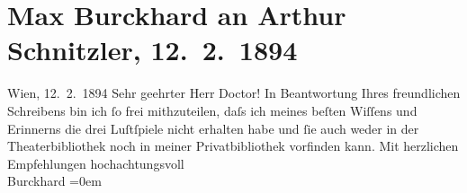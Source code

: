 

         
         \renewcommand{\erwaehntePersonen}{Personen: Max Eugen Burckhard}
         \renewcommand{\erwaehnteInstitutionen}{Institutionen: Burgtheater}
         \renewcommand{\erwaehnteOrte}{Orte: Wien}
         \renewcommand{\erwaehnteWerke}{Werke: Anatol}
               \section[Max Burckhard an Arthur Schnitzler, 12. 2. 1894]{ Max Burckhard an Arthur Schnitzler, 12. 2. 1894}\nopagebreak{}\rehead{ }\begin{ledgroupsized}[t]{13cm}\normalsize\beginnumbering{} \toendnotes[C]{\smallbreak\pagebreak[2]} 
\toendnotes[C]{\smallbreak}\pstart
           \noindent{}{\pb}\textcolor{gray}{\textbf{\label{T_L00298-1v}\label{T_L00298-1h}}}\hfill Wien, 12. 2. 1894\pend
           \pstart{}Sehr geehrter Herr Doctor!\pend\pstart
           In Beantwortung Ihres freundlichen Schreibens bin ich ſo frei mithzuteilen, daſs ich
               meines beſten Wiſſens und Erinnerns die drei Luſtſpiele nicht erhalten habe und ſie auch weder in der
               Theaterbibliothek noch in meiner Privatbibliothek vorfinden kann.\pend
           \pstart
           Mit herzlichen Empfehlungen hochachtungsvoll{\\[\baselineskip]}\spacefill\mbox{Burckhard}\pend
           \leftskip=0em{}
         
         \endnumbering{}\end{ledgroupsized}  \newcommand{\dateiname}{L00298}\newcommand{\titel}{Max Burckhard an Arthur Schnitzler, 12. 2. 1894}\newcommand{\editorInnen}{Martin Anton Müller und Gerd-Hermann Susen}
      